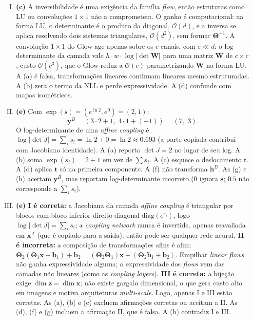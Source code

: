 \documentclass{dlproblemset}
\begin{document}
\begin{enumerate}[I)]
    \item \textbf{(c)} A inversibilidade é uma exigência da família \textit{flow}, então estruturas como LU ou convoluções $1{\times}1$ não a comprometem. O ganho é computacional: na forma LU, o determinante é o produto da diagonal, $\mathcal{O}(d)$, e a inversa se aplica resolvendo dois sistemas triangulares, $\mathcal{O}(d^2)$, sem formar $\mathbf{\Theta}^{-1}$. A convolução $1{\times}1$ do Glow age apenas sobre os $c$ canais, com $c \ll d$: o log-determinante da camada vale $h \cdot w \cdot \log|\det \mathbf{W}|$ para uma matriz $\mathbf{W}$ de $c \times c$, custo $\mathcal{O}(c^3)$, que o Glow reduz a $\mathcal{O}(c)$ parametrizando $\mathbf{W}$ na forma LU. A (a) é falsa, transformações lineares continuam lineares mesmo estruturadas. A (b) zera o termo da NLL e perde expressividade. A (d) confunde com mapas isométricos.

    \item \textbf{(e)} Com $\exp(\mathbf{s}) = (e^{\ln 2}, e^{0}) = (2, 1)$:
    \[
    \mathbf{y}^B = (3\cdot 2 + 1,\; 4\cdot 1 + (-1)) = (7,\; 3).
    \]
    O log-determinante de uma \textit{affine coupling} é $\log\lvert\det J\rvert = \sum_i s_i = \ln 2 + 0 = \ln 2 \approx 0.693$ (a parte copiada contribui com Jacobiano identidade). A (a) reporta $\det J = 2$ no lugar de seu log. A (b) soma $\exp(s_i) = 2 + 1$ em vez de $\sum s_i$. A (c) esquece o deslocamento $\mathbf{t}$. A (d) aplica $\mathbf{t}$ só na primeira componente. A (f) não transforma $\mathbf{h}^B$. As (g) e (h) acertam $\mathbf{y}^B$, mas reportam log-determinante incorreto ($0$ ignora $\mathbf{s}$; $0.5$ não corresponde a $\sum_i s_i$).

    \item \textbf{(e)} \textbf{I é correta:} a Jacobiana da camada \textit{affine coupling} é triangular por blocos com bloco inferior-direito diagonal $\mathrm{diag}(e^{s_i})$, logo $\log|\det J| = \sum_i s_i$; a \textit{coupling network} nunca é invertida, apenas reavaliada em $\mathbf{x}^{A}$ (que é copiado para a saída), então pode ser qualquer rede neural. \textbf{II é incorreta:} a composição de transformações afins é afim: $\mathbf{\Theta}_2(\mathbf{\Theta}_1\mathbf{x} + \mathbf{b}_1) + \mathbf{b}_2 = (\mathbf{\Theta}_2\mathbf{\Theta}_1)\mathbf{x} + (\mathbf{\Theta}_2\mathbf{b}_1 + \mathbf{b}_2)$. Empilhar \textit{linear flows} não ganha expressividade alguma; a expressividade dos \textit{flows} vem das camadas não lineares (como as \textit{coupling layers}). \textbf{III é correta:} a bijeção exige $\dim\mathbf{z} = \dim\mathbf{x}$; não existe gargalo dimensional, o que gera custo alto em imagens e motiva arquiteturas \textit{multi-scale}. Logo, apenas I e III estão corretas. As (a), (b) e (c) excluem afirmações corretas ou aceitam a II. As (d), (f) e (g) incluem a afirmação II, que é falsa. A (h) contradiz I e III.


\end{enumerate}
\end{document}
